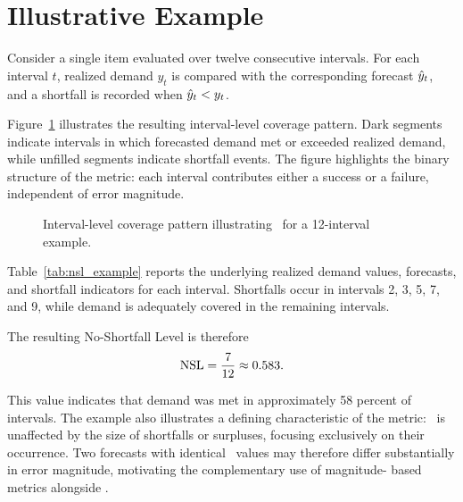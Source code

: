 \section{Illustrative Example}

Consider a single item evaluated over twelve consecutive intervals. For each
interval $t$, realized demand $y_t$ is compared with the corresponding forecast
$\hat{y}_t$, and a shortfall is recorded when $\hat{y}_t < y_t$.

Figure~\ref{fig:nsl_interval_coverage} illustrates the resulting interval-level
coverage pattern. Dark segments indicate intervals in which forecasted demand met
or exceeded realized demand, while unfilled segments indicate shortfall events.
The figure highlights the binary structure of the metric: each interval contributes
either a success or a failure, independent of error magnitude.

\begin{figure}[h!]
\centering

\caption{Interval-level coverage pattern illustrating \NSL\ for a 12-interval example.}
\label{fig:nsl_interval_coverage}
\end{figure}

Table~\ref{tab:nsl_example} reports the underlying realized demand values, forecasts,
and shortfall indicators for each interval. Shortfalls occur in intervals 2, 3, 5,
7, and 9, while demand is adequately covered in the remaining intervals.



The resulting No-Shortfall Level is therefore
\[
\text{NSL} = \frac{7}{12} \approx 0.583.
\]

This value indicates that demand was met in approximately 58 percent of intervals.
The example also illustrates a defining characteristic of the metric: \NSL\ is
unaffected by the size of shortfalls or surpluses, focusing exclusively on their
occurrence. Two forecasts with identical \NSL\ values may therefore differ
substantially in error magnitude, motivating the complementary use of magnitude-
based metrics alongside \NSL.
